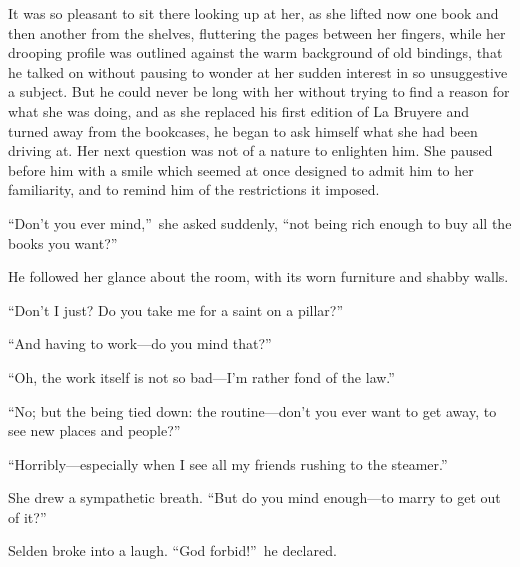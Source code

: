 \documentclass[12pt,a4paper]{book}
\begin{document}
It was so pleasant to sit there looking up at her, as she lifted
now one book and then another from the shelves, fluttering the
pages between her fingers, while her drooping profile was
outlined against the warm background of old bindings, that he
talked on without pausing to wonder at her sudden interest in so
unsuggestive a subject. But he could never be long with her
without trying to find a reason for what she was doing, and as
she replaced his first edition of La Bruyere and turned away from
the bookcases, he began to ask himself what she had been driving
at. Her next question was not of a nature to enlighten him. She
paused before him with a smile which seemed at once designed to
admit him to her familiarity, and to remind him of the
restrictions it imposed.





``Don't you ever mind,''\ she asked suddenly, ``not being rich enough
to buy all the books you want?''





He followed her glance about the room, with its worn furniture
and shabby walls.





``Don't I just? Do you take me for a saint on a pillar?''





``And having to work---do you mind that?''





``Oh, the work itself is not so bad---I'm rather fond of the law.''





``No; but the being tied down: the routine---don't you ever want to
get away, to see new places and people?''





``Horribly---especially when I see all my friends rushing to the
steamer.''





She drew a sympathetic breath. ``But do you mind enough---to marry
to get out of it?''





Selden broke into a laugh. ``God forbid!''\ he declared.
\end{document}
